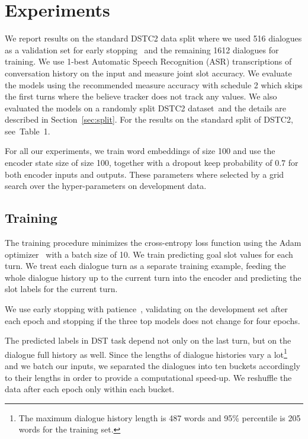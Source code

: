 \documentclass{itatnew}
\begin{document}
\section{Experiments}\label{sec:exp}
We report results on the standard DSTC2 data split where we used 516 dialogues as a validation set for early stopping~\cite{prechelt1998early} and the remaining 1612 dialogues for training.
We use 1-best Automatic Speech Recognition (ASR) transcriptions of conversation history on the input and measure joint slot accuracy.
We evaluate the models using the recommended measure accuracy with schedule 2 which skips the first turns where the believe tracker does not track any values. 
We also evaluated the models on a randomly split DSTC2 dataset\, and the details are described in Section~\ref{sec:split}.
For the results on the standard split of DSTC2, see~Table~1.

For all our experiments, we train word embeddings of size 100 and use the encoder state size of size 100, together with a dropout keep probability of $0.7$ for both encoder inputs and outputs.
These parameters where selected by a grid search over the hyper-parameters on development data.

\subsection{Training}
\label{sec:train}
The training procedure minimizes the cross-entropy loss function using the Adam optimizer~\cite{kingma2014adam} with a batch size of 10.
We train predicting goal slot values for each turn.
We treat each dialogue turn as a separate training example, feeding the whole dialogue history up to the current turn into the encoder and predicting the slot labels for the current turn.

We use early stopping with patience~\cite{prechelt1998early}, validating on the development set after each epoch and stopping if the three top models does not change for four epochs.

The predicted labels in DST task depend not only on the last turn, but on the dialogue full history as well.
Since the lengths of dialogue histories vary a lot\footnote{The maximum dialogue history length is 487 words and 95\% percentile is 205 words for the training set.} and we batch our inputs, we separated the dialogues into ten buckets accordingly to their lengths in order to provide a computational speed-up. We reshuffle the data after each epoch only within each bucket.
\end{document}
